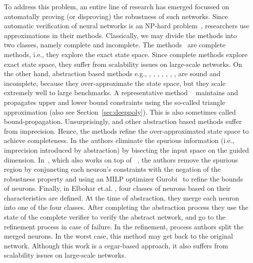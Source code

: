 To address this problem, an entire line of research has emerged focussed on automatally proving (or disproving) the robustness of such networks. Since automatic verification of neural networks is an NP-hard problem~\cite{?}, researchers use approximations in their methods. Classically, we may divide the methods into two classes, namely complete and incomplete. The methods~\cite{lomuscio2017approach,fischetti2018deep,dutta2018output,cheng2017maximum,katz2017reluplex,katz2019marabou,ehlers2017formal,huang2017safety,wang2021beta,xu2020fast,zhang2022general} are complete methods, i.e., they explore the exact state space. Since complete methods explore exact state space, they suffer from scalability issues on large-scale networks. On the other hand, abstraction based methods e.g., \cite{dvijotham2018dual}, \cite{gehr2018ai2}, \cite{singh2018fast},  \cite{singh2018boosting}, \cite{weng2018towards}, \cite{wong2018provable}, \cite{zhang2018efficient}, \cite{zhang2018efficient} are sound and incomplete, because they over-approximate the state space, but they scale extremely well to large benchmarks. A representative method \deeppoly{}~\cite{singh2019abstract} maintains and propagates upper and lower bound constraints using the so-called triangle approximation (also see Section~\ref{sec:deeppoly}). This is also sometimes called bound-propagation. %
Unsurprisingly, \deeppoly{} and other abstraction based methods suffer from imprecision. Hence, the methods \cite{wang2018formal,wang2018efficient,elboher2020abstraction,yang2021improving,lin2020art} refine the over-approximated state space to achieve completeness. In \cite{wang2018formal,wang2018efficient,lin2020art} the authors eliminate the spurious information (i.e., imprecision introduced by abstraction) by bisecting the input space on the guided dimension. In~\cite{yang2021improving}, which also works on top of \deeppoly{}~\cite{singh2019abstract}, the authors remove the spurious region by  conjuncting each neuron's constraints with the negation of the robustness property and using an MILP optimizer Gurobi~\cite{gurobioptimizer} to refine the bounds of neurons. Finally, in Elbohar et.al. \cite{elboher2020abstraction}, four classes of neurons based on their characteristics are defined. At the time of abstraction, they merge each neuron into one of the four classes.  After completing the abstraction process they use the state of the complete verifier to verify  the abstract network, and go to the refinement process in case of failure.   In the refinement, process authors split the merged neurons.  In the worst case, this method may get back to the original network.  Although this work is a cegar-based approach, it also suffers from scalability issues on large-scale networks. %

